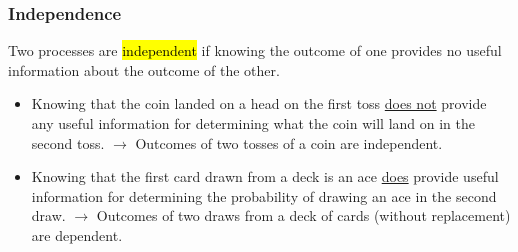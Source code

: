 \documentclass[11pt,containsverbatim,handout]{beamer}
\begin{document}
\begin{frame}
\frametitle{Independence}

Two processes are \hl{independent} if knowing the outcome of one provides no useful information about the outcome of the other.

\pause

\begin{itemize}

\item Knowing that the coin landed on a head on the first toss \underline{does not} provide any useful information for determining what the coin will land on in the second toss. $\rightarrow$ Outcomes of two tosses of a coin are independent.

\pause

\item Knowing that the first card drawn from a deck is an ace \underline{does} provide useful information for determining the probability of drawing an ace in the second draw. $\rightarrow$ Outcomes of two draws from a deck of cards (without replacement) are dependent.

\end{itemize}

\end{frame}





\end{document}
